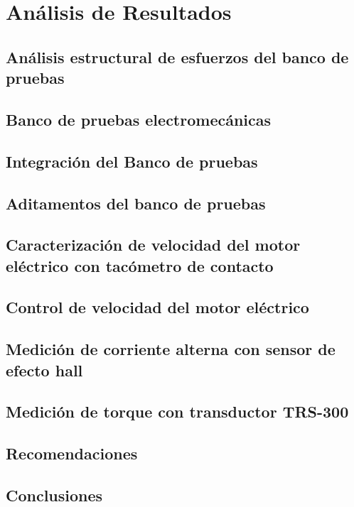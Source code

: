 \chapter{Análisis de Resultados}


\section{Análisis estructural de esfuerzos del banco de pruebas}
\section{Banco de pruebas electromecánicas} 
\section{Integración del Banco de pruebas} 
\section{Aditamentos del banco de pruebas} 
\section{Caracterización de velocidad del motor eléctrico con tacómetro de contacto}
\section{Control de velocidad del motor eléctrico}  
\section{Medición de corriente alterna con sensor de efecto hall} 	
\section{Medición de torque con transductor TRS-300} 
\section{Recomendaciones} 
\section{Conclusiones}

